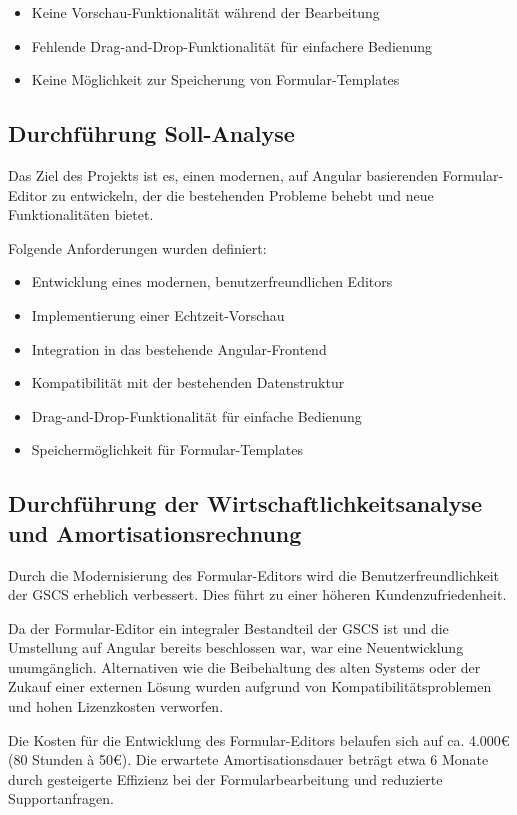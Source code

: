\documentclass[a4paper,11pt]{article}
\begin{document}
\begin{itemize}
\item Keine Vorschau-Funktionalität während der Bearbeitung
\item Fehlende Drag-and-Drop-Funktionalität für einfachere Bedienung
\item Keine Möglichkeit zur Speicherung von Formular-Templates
\end{itemize}

\subsection{Durchführung Soll-Analyse}

Das Ziel des Projekts ist es, einen modernen, auf Angular basierenden Formular-Editor zu entwickeln, der die bestehenden Probleme behebt und neue Funktionalitäten bietet.

Folgende Anforderungen wurden definiert:

\begin{itemize}
\item Entwicklung eines modernen, benutzerfreundlichen Editors
\item Implementierung einer Echtzeit-Vorschau
\item Integration in das bestehende Angular-Frontend
\item Kompatibilität mit der bestehenden Datenstruktur
\item Drag-and-Drop-Funktionalität für einfache Bedienung
\item Speichermöglichkeit für Formular-Templates
\end{itemize}

\subsection{Durchführung der Wirtschaftlichkeitsanalyse und Amortisationsrechnung}

Durch die Modernisierung des Formular-Editors wird die Benutzerfreundlichkeit der GSCS erheblich verbessert. Dies führt zu einer höheren Kundenzufriedenheit.

Da der Formular-Editor ein integraler Bestandteil der GSCS ist und die Umstellung auf Angular bereits beschlossen war, war eine Neuentwicklung unumgänglich. Alternativen wie die Beibehaltung des alten Systems oder der Zukauf einer externen Lösung wurden aufgrund von Kompatibilitätsproblemen und hohen Lizenzkosten verworfen.

Die Kosten für die Entwicklung des Formular-Editors belaufen sich auf ca. 4.000€ (80 Stunden à 50€). Die erwartete Amortisationsdauer beträgt etwa 6 Monate durch gesteigerte Effizienz bei der Formularbearbeitung und reduzierte Supportanfragen.
\end{document}
